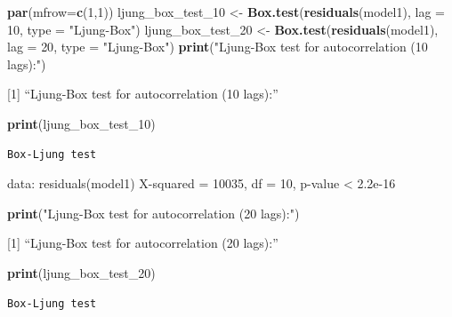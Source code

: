 \documentclass[
]{article}
\newenvironment{Shaded}{\begin{snugshade}}{\end{snugshade}}
\newcommand{\AttributeTok}[1]{\textcolor[rgb]{0.13,0.29,0.53}{#1}}
\newcommand{\DecValTok}[1]{\textcolor[rgb]{0.00,0.00,0.81}{#1}}
\newcommand{\FunctionTok}[1]{\textcolor[rgb]{0.13,0.29,0.53}{\textbf{#1}}}
\newcommand{\NormalTok}[1]{#1}
\newcommand{\OtherTok}[1]{\textcolor[rgb]{0.56,0.35,0.01}{#1}}
\newcommand{\StringTok}[1]{\textcolor[rgb]{0.31,0.60,0.02}{#1}}
\begin{document}
\begin{Shaded}
\begin{Highlighting}[]
  \FunctionTok{par}\NormalTok{(}\AttributeTok{mfrow=}\FunctionTok{c}\NormalTok{(}\DecValTok{1}\NormalTok{,}\DecValTok{1}\NormalTok{))}
\NormalTok{  ljung\_box\_test\_10 }\OtherTok{\textless{}{-}} \FunctionTok{Box.test}\NormalTok{(}\FunctionTok{residuals}\NormalTok{(model1), }\AttributeTok{lag =} \DecValTok{10}\NormalTok{, }\AttributeTok{type =} \StringTok{"Ljung{-}Box"}\NormalTok{)}
\NormalTok{  ljung\_box\_test\_20 }\OtherTok{\textless{}{-}} \FunctionTok{Box.test}\NormalTok{(}\FunctionTok{residuals}\NormalTok{(model1), }\AttributeTok{lag =} \DecValTok{20}\NormalTok{, }\AttributeTok{type =} \StringTok{"Ljung{-}Box"}\NormalTok{)}
  \FunctionTok{print}\NormalTok{(}\StringTok{"Ljung{-}Box test for autocorrelation (10 lags):"}\NormalTok{)}
\end{Highlighting}
\end{Shaded}

{[}1{]} ``Ljung-Box test for autocorrelation (10 lags):''

\begin{Shaded}
\begin{Highlighting}[]
  \FunctionTok{print}\NormalTok{(ljung\_box\_test\_10)}
\end{Highlighting}
\end{Shaded}

\begin{verbatim}
Box-Ljung test
\end{verbatim}

data: residuals(model1) X-squared = 10035, df = 10, p-value \textless{}
2.2e-16

\begin{Shaded}
\begin{Highlighting}[]
  \FunctionTok{print}\NormalTok{(}\StringTok{"Ljung{-}Box test for autocorrelation (20 lags):"}\NormalTok{)}
\end{Highlighting}
\end{Shaded}

{[}1{]} ``Ljung-Box test for autocorrelation (20 lags):''

\begin{Shaded}
\begin{Highlighting}[]
  \FunctionTok{print}\NormalTok{(ljung\_box\_test\_20)}
\end{Highlighting}
\end{Shaded}

\begin{verbatim}
Box-Ljung test
\end{verbatim}
\end{document}
